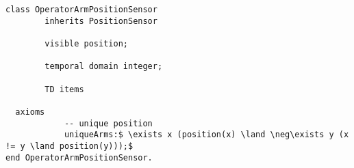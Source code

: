 \begin{lstlisting}[fontadjust, mathescape, frame=single] 
class OperatorArmPositionSensor
        inherits PositionSensor

        visible position;

        temporal domain integer;

        TD items
  
  axioms
            -- unique position
            uniqueArms:$ \exists x (position(x) \land \neg\exists y (x != y \land position(y)));$
end OperatorArmPositionSensor.\end{lstlisting}